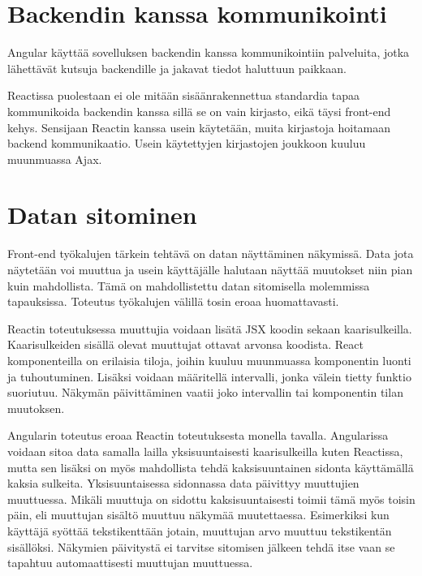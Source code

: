 \documentclass[a4paper,12pt,twoside]{article} %
\begin{document}
\newpage


\section{Backendin kanssa kommunikointi}

Angular käyttää sovelluksen backendin kanssa kommunikointiin palveluita, jotka lähettävät kutsuja backendille ja jakavat tiedot haluttuun paikkaan.

\vspace{4mm}\noindent Reactissa puolestaan ei ole mitään sisäänrakennettua standardia tapaa kommunikoida backendin kanssa sillä se on vain kirjasto, eikä täysi front-end kehys. Sensijaan Reactin kanssa usein käytetään, muita kirjastoja hoitamaan backend kommunikaatio. Usein käytettyjen kirjastojen joukkoon kuuluu muunmuassa Ajax.

\newpage

\section{Datan sitominen}

Front-end työkalujen tärkein tehtävä on datan näyttäminen näkymissä. Data jota näytetään voi muuttua ja usein käyttäjälle halutaan näyttää muutokset niin pian kuin mahdollista. Tämä on mahdollistettu datan sitomisella molemmissa tapauksissa. Toteutus työkalujen välillä tosin eroaa huomattavasti.

\vspace{4mm}\noindent Reactin toteutuksessa muuttujia voidaan lisätä JSX koodin sekaan kaarisulkeilla. Kaarisulkeiden sisällä olevat muuttujat ottavat arvonsa koodista. React komponenteilla on erilaisia tiloja, joihin kuuluu muunmuassa komponentin luonti ja tuhoutuminen. Lisäksi voidaan määritellä intervalli, jonka välein tietty funktio suoriutuu. Näkymän päivittäminen vaatii joko intervallin tai komponentin tilan muutoksen.

\vspace{4mm}\noindent
Angularin toteutus eroaa Reactin toteutuksesta monella tavalla. Angularissa voidaan sitoa data samalla lailla yksisuuntaisesti kaarisulkeilla kuten Reactissa, mutta sen lisäksi on myös mahdollista tehdä kaksisuuntainen sidonta käyttämällä kaksia sulkeita. Yksisuuntaisessa sidonnassa data päivittyy muuttujien muuttuessa. Mikäli muuttuja on sidottu kaksisuuntaisesti toimii tämä myös toisin päin, eli muuttujan sisältö muuttuu näkymää muutettaessa. Esimerkiksi kun käyttäjä syöttää tekstikenttään jotain, muuttujan arvo muuttuu tekstikentän sisällöksi. Näkymien päivitystä ei tarvitse sitomisen jälkeen tehdä itse vaan se tapahtuu automaattisesti muuttujan muuttuessa.
\end{document}
